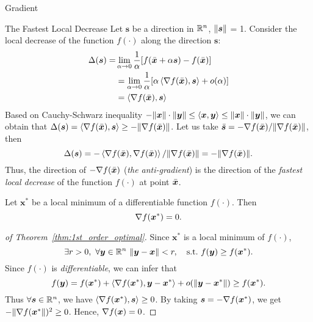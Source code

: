 \begin{note}{Gradient}
    \begin{boxnote}{The Fastest Local Decrease}
        Let \(\bm{s}\) be a direction in \(\mathbb{R}^n\), \(\norm{\bm{s}}\) = 1. Consider the local decrease of the function \(f(\cdot)\) along the direction \(\bm{s}\):
        \[
            \begin{aligned}
                \Delta(\bm{s}) = &\lim_{\alpha \to 0} \frac{1}{\alpha} [f(\bar{\bm{x}} + \alpha \bm{s}) - f(\bar{\bm{x}})]\\
                &= \lim_{\alpha \to 0}\frac{1}{\alpha}[\alpha \left\langle \nabla f(\bar{\bm{x}}), \bm{s} \right\rangle + o(\alpha)]\\
                &= \left\langle \nabla f(\bar{\bm{x}}), \bm{s} \right\rangle
            \end{aligned}
        \] 
        Based on Cauchy-Schwarz inequality \( -\norm{\bm{x}}\cdot\norm{\bm{y}} \le \left\langle \bm{x}, \bm{y} \right\rangle \le \norm{\bm{x}}\cdot\norm{\bm{y}} \), 
        we can obtain that \(\Delta(\bm{s}) = \left\langle \nabla f(\bar{\bm{x}}), \bm{s} \right\rangle \ge -\norm{\nabla f(\bar{\bm{x}})}\). 
        Let us take \(\bar{\bm{s}} = -\nabla f(\bar{\bm{x}}) / \norm{\nabla f(\bar{\bm{x}})}\), then
        \[
            \Delta(\bm{s}) = -\left\langle \nabla f(\bar{\bm{x}}), \nabla f(\bar{\bm{x}}) \right\rangle / \norm{\nabla f(\bar{\bm{x}})} = - \norm{\nabla f(\bar{\bm{x}})}.
        \]
        Thus, the direction of \(-\nabla f(\bar{\bm{x}})\) (\emph{the anti-gradient}) is the direction of the \emph{fastest local decrease} of the function \(f(\cdot)\) at point \(\bar{\bm{x}}\).
    \end{boxnote}
\end{note}

\begin{thm}\label{thm:1st_order_optimal}
    Let \(\bm{x}^*\) be a local minimum of a differentiable function \(f(\cdot)\). Then
    \begin{equation}\label{eq:1st_order_optimal}
        \nabla f(\bm{x}^*) = 0.
    \end{equation}
\end{thm}

\begin{proof}[of Theorem~\ref{thm:1st_order_optimal}]
    Since \(\bm{x}^*\) is a local minimum of \(f(\cdot)\),
    \[
      \exists r > 0,~\forall \bm{y} \in \mathbb{R}^n ~ \norm{\bm{y} - \bm{x}} < r,  \quad \text{s.t.}~ f(\bm{y}) \ge f(\bm{x}^*).
    \] 
    Since \(f(\cdot)\) is \emph{differentiable}, we can infer that
    \[
        f(\bm{y}) = f(\bm{x}^*) + \left\langle \nabla f(\bm{x}^*), \bm{y} - \bm{x}^* \right\rangle + o(\norm{\bm{y} - \bm{x}^*}) \ge f(\bm{x}^*).
    \]
    Thus \(\forall \bm{s} \in \mathbb{R}^n\), we have \(\left\langle \nabla f(\bm{x}^*), \bm{s} \right\rangle \ge 0\). By taking \(\bm{s} = -\nabla f(\bm{x}^*)\), 
    we get \(-\norm{\nabla f(\bm{x}^*})^2 \ge 0\). Hence, \(\nabla f(\bm{x}) = 0\).
\end{proof}

